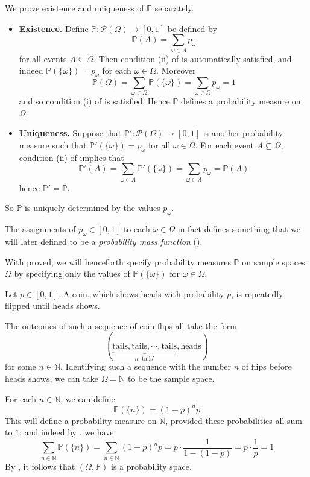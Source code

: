 \begin{cproof}
We prove existence and uniqueness of $\mathbb{P}$ separately.
\begin{itemize}
\item \textbf{Existence.} Define $\mathbb{P} : \mathcal{P}(\Omega) \to [0,1]$ be defined by
\[ \mathbb{P}(A) = \sum_{\omega \in A} p_{\omega} \]
for all events $A \subseteq \Omega$. Then condition (ii) of  is automatically satisfied, and indeed $\mathbb{P}(\{\omega\}) = p_{\omega}$ for each $\omega \in \Omega$. Moreover
\[ \mathbb{P}(\Omega) = \sum_{\omega \in \Omega} \mathbb{P}(\{\omega\}) = \sum_{\omega \in \Omega} p_{\omega} = 1 \]
and so condition (i) of  is satisfied. Hence $\mathbb{P}$ defines a probability measure on $\Omega$.
\item \textbf{Uniqueness.} Suppose that $\mathbb{P}' : \mathcal{P}(\Omega) \to [0,1]$ is another probability measure such that $\mathbb{P}'(\{\omega\})=p_{\omega}$ for all $\omega \in \Omega$. For each event $A \subseteq \Omega$, condition (ii) of  implies that
\[ \mathbb{P}'(A) = \sum_{\omega \in A} \mathbb{P}'(\{\omega\}) = \sum_{\omega \in A} p_{\omega} = \mathbb{P}(A) \]
hence $\mathbb{P}'=\mathbb{P}$.
\end{itemize}
So $\mathbb{P}$ is uniquely determined by the values $p_{\omega}$.
\end{cproof}

The assignments of $p_{\omega} \in [0,1]$ to each $\omega \in \Omega$ in fact defines something that we will later defined to be a \textit{probability mass function} ().

With  proved, we will henceforth specify probability measures $\mathbb{P}$ on sample spaces $\Omega$ by specifying only the values of $\mathbb{P}(\{\omega\})$ for $\omega \in \Omega$.

\begin{example}
Let $p \in [0,1]$. A coin, which shows heads with probability $p$, is repeatedly flipped until heads shows.

The outcomes of such a sequence of coin flips all take the form
\[ (\underbrace{\text{tails}, \text{tails}, \cdots,\text{tails}}_{n \text{ `tails'}}, \text{heads}) \]
for some $n \in \mathbb{N}$. Identifying such a sequence with the number $n$ of flips before heads shows, we can take $\Omega = \mathbb{N}$ to be the sample space.

For each $n \in \mathbb{N}$, we can define
\[ \mathbb{P}(\{n\}) = (1-p)^np \]
This will define a probability measure on $\mathbb{N}$, provided these probabilities all sum to $1$; and indeed by , we have
\[ \sum_{n \in \mathbb{N}} \mathbb{P}(\{n\}) = \sum_{n \in \mathbb{N}} (1-p)^np = p \cdot \frac{1}{1-(1-p)} = p \cdot \frac{1}{p} = 1 \]
By , it follows that $(\Omega,\mathbb{P})$ is a probability space.
\end{example}

